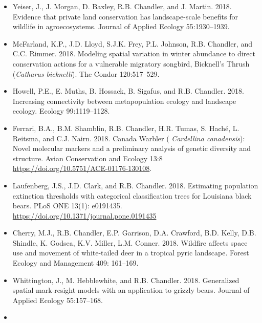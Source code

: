 \documentclass[12pt]{article}
\begin{document}
\begin{itemize}
\item Yeiser, J., J. Morgan, D. Baxley, R.B. Chandler, and
  J. Martin. 2018. Evidence that private land conservation
  has landscape-scale benefits for wildlife in agroecosystems. Journal
  of Applied Ecology 55:1930--1939. 

\item McFarland, K.P., J.D. Lloyd, S.J.K. Frey, P.L. Johnson,
  R.B. Chandler, and C.C. Rimmer. 2018. Modeling spatial
  variation in winter abundance to direct conservation actions for a
  vulnerable migratory songbird, Bicknell’s Thrush ({\it Catharus
    bicknelli}). The Condor 120:517--529. 

\item Howell, P.E., E. Muths, B. Hossack, B. Sigafus, and
  R.B. Chandler. 2018. Increasing connectivity between 
  metapopulation ecology and landscape ecology. Ecology 99:1119--1128.  
  
\item Ferrari, B.A., B.M. Shamblin, R.B. Chandler, H.R. Tumas, S. Hach\'e,
  L. Reitsma, and C.J. Nairn. 2018. Canada Warbler ({\it
  Cardellina canadensis}): Novel molecular markers and a preliminary
  analysis of genetic diversity and structure. Avian Conservation and
  Ecology 13:8 \url{https://doi.org/10.5751/ACE-01176-130108}.

\item Laufenberg, J.S., J.D. Clark, and
  R.B. Chandler. 2018. Estimating population extinction thresholds 
  with categorical classification trees for Louisiana black
  bears. PLoS ONE 13(1): e0191435.
  \url{https://doi.org/10.1371/journal.pone.0191435}

\item Cherry, M.J., R.B. Chandler, E.P. Garrison, D.A. Crawford,
  B.D. Kelly, D.B. Shindle, K. Godsea, K.V. Miller,
  L.M. Conner. 2018. Wildfire affects space use and movement of
  white-tailed deer in a tropical pyric landscape. Forest Ecology and
  Management 409: 161--169. 

\item Whittington, J., M. Hebblewhite, and
  R.B. Chandler. 2018. Generalized spatial mark-resight models with an 
  application to grizzly bears. Journal of Applied Ecology
  55:157--168. 



\item[] { \\}


\end{itemize}
\end{document}
